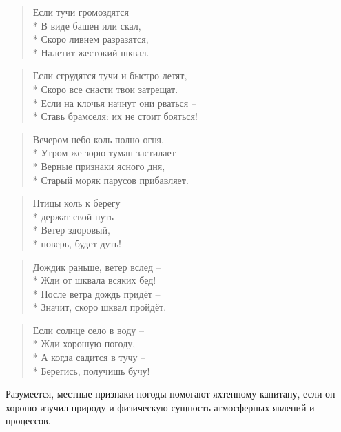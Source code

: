 \begin{quote}
Если тучи громоздятся \\*
В виде башен или скал, \\*
Скоро ливнем разразятся, \\*
Налетит жестокий шквал.
\end{quote}

\begin{quote}
Если сгрудятся тучи и быстро летят, \\*
Скоро все снасти твои затрещат. \\*
Если на клочья начнут они рваться \--- \\*
Ставь брамселя: их не стоит бояться!
\end{quote}

\begin{quote}
Вечером небо коль полно огня, \\*
Утром же зорю туман застилает \\*
Верные признаки ясного дня, \\*
Старый моряк парусов прибавляет.
\end{quote}

\begin{quote}
  Птицы коль к берегу \\*
  держат свой путь \--- \\*
  Ветер здоровый, \\*
  поверь, будет дуть!
\end{quote}

\begin{quote}
Дождик раньше, ветер вслед \--- \\*
Жди от шквала всяких бед! \\*
После ветра дождь придёт \--- \\*
Значит, скоро шквал пройдёт.
\end{quote}

\begin{quote}
Если солнце село в воду \--- \\*
Жди хорошую погоду, \\*
А когда садится в тучу \--- \\*
Берегись, получишь бучу!
\end{quote}

\normalsize

Разумеется, местные признаки погоды помогают яхтенному капитану, если
он хорошо изучил природу и физическую сущность атмосферных явлений и
процессов.

